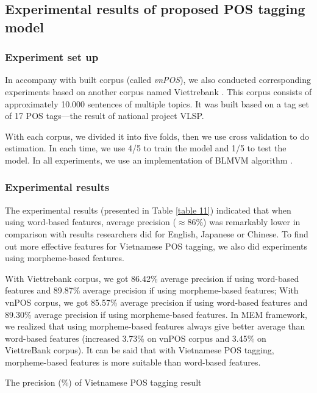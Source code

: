 \documentclass[english]{jnlp_1.4}
\begin{document}
\subsection{Experimental results of proposed POS tagging model}

\subsubsection{Experiment set up}

In accompany with built corpus (called \emph{vnPOS}), we also conducted corresponding experiments based on another corpus named Viettrebank \cite{VLNP}. This corpus consists of approximately 10.000 sentences of multiple topics. It was built based on a tag set of 17 POS tags---the result of national project VLSP.

With each corpus, we divided it into five folds, then we use cross validation to do estimation. In each time, we use 4/5 to train the model and 1/5 to test the model. In all experiments, we use an implementation of BLMVM algorithm \cite{Benson01}.

\subsubsection{Experimental results}

The experimental results (presented in Table \ref{table 11}) indicated that when using word-based features, average precision ($\approx$86\%) was remarkably lower in comparison with results researchers did for English, Japanese or Chinese.
   To find out more effective features for Vietnamese POS tagging, we also did experiments using morpheme-based features.

With Viettrebank corpus, we got 86.42\% average precision if using word-based features and 89.87\% average precision if using morpheme-based features; With vnPOS corpus, we got 85.57\% average precision if using word-based features and 89.30\% average precision if using morpheme-based features.
In MEM framework, we realized that using morpheme-based features always give better average than word-based features (increased 3.73\% on vnPOS corpus and 3.45\% on ViettreBank corpus).
It can be said that with Vietnamese POS tagging, morpheme-based features is more suitable than word-based features.

\begin{table}[t]
\caption{The precision (\%) of Vietnamese POS tagging result}
\label{table 11}

\end{table}
\end{document}
